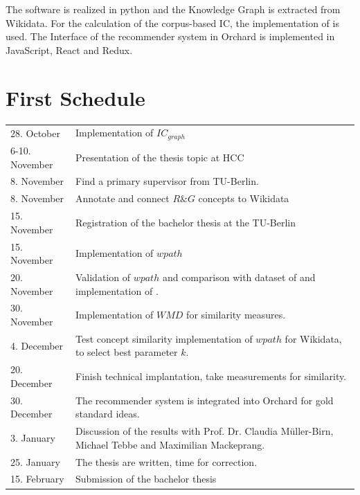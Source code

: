 \documentclass[pdftex,a4paper,12pt]{scrartcl}
\theoremstyle{definition}
\begin{document}
    The software is realized in python and  the Knowledge Graph is extracted from Wikidata.
    For the calculation of the corpus-based IC, the implementation of \citet{zhu_computing_2017} is used. 
    The Interface of the recommender system in Orchard is implemented in JavaScript, React and Redux.  
    

\section{First Schedule}
\renewcommand{\arraystretch}{1.5}
\begin{tabularx}{\textwidth}{lX}
28. October & Implementation of $IC_{graph}$\\
6-10. November & Presentation of the thesis topic at HCC\\
8. November & Find a primary supervisor from TU-Berlin.\\
8. November & Annotate and connect $R\&G$ concepts to Wikidata\\
15. November & Registration of the bachelor thesis at the TU-Berlin \\
15. November & Implementation of $wpath$\\
20. November & Validation of $wpath$ and comparison with dataset of \citet{rubenstein_contextual_1965} and implementation of \citet{zhu_computing_2017}.\\
30. November & Implementation of $WMD$ for similarity measures. \\
4. December & Test concept similarity implementation of $wpath$ for Wikidata, to select best parameter $k$. \\
20. December & Finish technical implantation, take measurements for similarity.\\
30. December & The recommender system is integrated into Orchard for gold standard ideas. \\
3. January & Discussion of the results with Prof. Dr. Claudia Müller-Birn, Michael Tebbe and Maximilian Mackeprang.\\
25. January & The thesis are written, time for correction.\\
15. February & Submission of the bachelor thesis\\
\end{tabularx}


\end{document}
